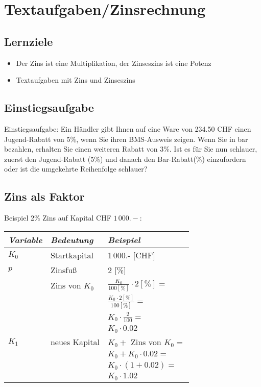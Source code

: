 
\newpage
\section{Textaufgaben/Zinsrechnung}
\subsection*{Lernziele}

\begin{itemize}
  \item Der Zins ist eine  Multiplikation, der Zinseszins ist eine Potenz
\item Textaufgaben mit Zins und Zinseszins
\end{itemize}

\subsection{Einstiegsaufgabe}
Einstiegsaufgabe:
Ein Händler gibt Ihnen auf eine Ware von 234.50 CHF einen Jugend-Rabatt von
5\%, wenn Sie ihren BMS-Ausweis zeigen. Wenn Sie in bar bezahlen, erhalten Sie
einen weiteren Rabatt von 3\%. Ist es für Sie nun schlauer, zuerst den
Jugend-Rabatt (5\%) und danach den Bar-Rabatt(\%) einzufordern oder
ist die umgekehrte Reihenfolge schlauer? 
\newpage



\subsection{Zins als Faktor}
Beispiel $2\%$ Zins auf Kapital CHF $1\,000.-$:\\

\begin{tabular}{l|l|l}
  \textit{Variable}  &   \textit{Bedeutung}   & \textit{Beispiel}\\%
\hline%
 $K_0$  & Startkapital & 1\,000.-  [CHF]\\\hline

 $p$    & Zinsfuß        & 2  [\%]\\\hline

        & Zins von $K_0$ & $\frac{K_0}{100[\%]}\cdot{}2[\%] =$\\
        &                & $\frac{K_0\cdot{}2[\%]}{100[\%]} =$\\        
        &                & $K_0 \cdot{} \frac2{100} = $\\
        &                & $K_0\cdot 0.02$ \\\hline

$K_1$   & neues Kapital  &   $K_0+$ Zins von  $K_0=$ \\
        &                &   $K_0+K_0\cdot{}0.02 = $ \\
        &                &   $K_0\cdot(1+0.02) = $\\
        &                &   $K_0\cdot{}1.02$\\
\end{tabular}

